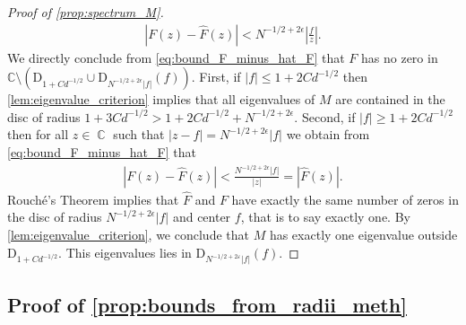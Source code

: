 \documentclass[11pt]{article}
\DeclareMathOperator{\CC}{\mathbb{C}}
\newcommand{\abs}[1]{\left| #1 \right|}
\newcommand{\absN}[1]{| #1 |}
\newcommand{\C}{\mathbb{C}}
\newcommand{\eps}{\varepsilon}
\theoremstyle{plain}
\theoremstyle{remark}
\numberwithin{equation}{section}
\begin{document}
\begin{proof}[Proof of \cref{prop:spectrum_M}]
   \begin{align}\label{eq:bound_F_minus_hat_F} 
       \absN{F(z) - \widehat{F}(z)} < N^{-1/2 + 2\epsilon}\abs{\frac{f}{z}}.
   \end{align}
   We directly conclude from  
 \cref{eq:bound_F_minus_hat_F} that $F$ has no zero in    $\C \setminus ( \mathrm{D}_{1+ C d^{-1/2}} \cup \mathrm{D}_{N^{-1/2 + 2\epsilon}|f|}(f))$. First, if  $\abs{f}\le 1+ 2 Cd^{-1/2}$ then  \cref{lem:eigenvalue_criterion} implies that all eigenvalues of $M$ are contained in the disc of radius $1+ 3 Cd^{-1/2} > 1+ 2Cd^{-1/2} + N^{-1/2+ 2 \epsilon}$. 
 Second, if $\abs{f}\ge 1+ 2 Cd^{-1/2}$ then for all $z \in \CC$ such that $\abs{z-f} = N^{-1/2 + 2\epsilon}|f|$
 we obtain from \cref{eq:bound_F_minus_hat_F} that 
    \begin{align*}
       \absN{F(z) - \widehat{F}(z)} <\frac{N^{-1/2 + 2\epsilon}|f|}{\abs{z}} = \absN{\widehat{F}(z)}.
   \end{align*}
   Rouch{\'e}'s Theorem implies that $\widehat{F}$ and $F$ have exactly the same number of zeros in the disc of radius $N^{-1/2 + 2\epsilon}|f|$ and center $f$, that is to say exactly one. 
    By \cref{lem:eigenvalue_criterion}, we conclude that $M$ has 
   exactly one eigenvalue outside $\mathrm{D}_{1 + Cd ^{-1/2}}$. This eigenvalues lies in $\mathrm{D}_{ N^{-1/2 +2\eps}\abs{f}}(f)$.  
\end{proof}

\subsection{Proof of \cref{prop:bounds_from_radii_meth}}\label{section:proofbounds_from_radii_meth}
\end{document}
